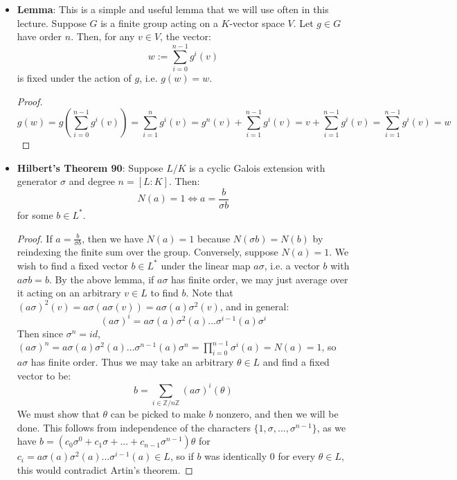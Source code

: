 \documentclass[11pt, oneside]{amsart}   	%
\theoremstyle{definition}
\begin{document}
\begin{itemize}

	\item \textbf{Lemma}: This is a simple and useful lemma that we will use often in this lecture. Suppose $G$ is a finite group acting on a $K$-vector 
	space $V$. Let $g\in G$ have order $n$. Then, for any $v\in V$, the vector:
	$$
		w := \sum_{i = 0}^{n - 1}g^i(v)
	$$
	is fixed under the action of $g$, i.e. $g(w) = w$.
	
	\begin{proof}
		$$
		g(w) = g(\sum_{i = 0}^{n - 1} g^i(v)) = \sum_{i = 1}^n g^i(v) = g^n(v) + \sum_{i = 1}^{n - 1}g^i(v) = v + \sum_{i = 1}^{n - 1}g^i(v) = 
		\sum_{i = 1}^{n - 1}g^i(v) = w
		$$
	\end{proof}

	\item \textbf{Hilbert's Theorem 90}: Suppose $L / K$ is a cyclic Galois extension with generator $\sigma$ and degree $n = [L : K]$. Then: 
	$$
	N(a) = 1 \iff a = \frac{b}{\sigma b}
	$$
	for some $b\in L^*$.
	
	\begin{proof}
	
		If $a = \frac{b}{\sigma b}$, then we have $N(a) = 1$ because $N(\sigma b) = N(b)$ by reindexing the finite sum over the group. Conversely, 
		suppose $N(a) = 1$. We wish to find a fixed vector $b\in L^*$ under the linear map $a\sigma$, i.e. a vector $b$ with $a\sigma b = b$. By the 
		above lemma, if $a\sigma$ has finite order, we may just average over it acting on an arbitrary $v\in L$ to find $b$. Note that $(a\sigma)^2(v) = 
		a\sigma(a\sigma(v)) = a\sigma(a)\sigma^2(v)$, and in general:
		$$
			(a\sigma)^i = a\sigma(a)\sigma^2(a)...\sigma^{i - 1}(a)\sigma^i
		$$
		Then since $\sigma^n = id$, $(a\sigma)^n = a\sigma(a)\sigma^2(a)...\sigma^{n - 1}(a)\sigma^n = \prod_{i = 0}^{n - 1}\sigma^i(a) = N(a) = 1$, 
		so $a\sigma$ has finite order. Thus we may take an arbitrary $\theta\in L$ and find a fixed vector to be:
		$$
			b = \sum_{i\in\mathbb Z / n\mathbb Z}(a\sigma)^i(\theta)
		$$
		We must show that $\theta$ can be picked to make $b$ nonzero, and then we will be done. This follows from independence of the characters 
		$\{1, \sigma, ..., \sigma^{n - 1}\}$, as we have $b = (c_0 \sigma^0 + c_1\sigma + ... + c_{n - 1}\sigma^{n - 1})\theta$ for $c_i = a\sigma(a)
		\sigma^2(a)...\sigma^{i - 1}(a)\in L$, so if $b$ was identically 0 for every $\theta\in L$, this would contradict Artin's theorem. 
	
	\end{proof}
	

\end{itemize}
\end{document}
